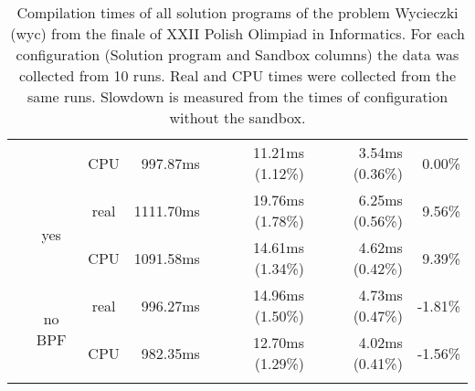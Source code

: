 \documentclass[en]{pracamgr}
\begin{document}
\begin{appendices}
\begin{small}
\begin{longtable}{|l|c|c|r|r|r|r|}
                            &                         & CPU  & 997.87ms & 11.21ms (1.12\%) & 3.54ms (0.36\%) & 0.00\% \\*
                            \cline{2-7}
                            & \multirow{2}{*}{yes}    & real & 1111.70ms & 19.76ms (1.78\%) & 6.25ms (0.56\%) & 9.56\% \\*
                            &                         & CPU  & 1091.58ms & 14.61ms (1.34\%) & 4.62ms (0.42\%) & 9.39\% \\*
                            \cline{2-7}
                            & \multirow{2}{*}{no BPF} & real & 996.27ms & 14.96ms (1.50\%) & 4.73ms (0.47\%) & -1.81\% \\*
                            &                         & CPU  & 982.35ms & 12.70ms (1.29\%) & 4.02ms (0.41\%) & -1.56\% \\
\hline
\pagebreak
\caption{Compilation times of all solution programs of the problem Wycieczki (wyc) from the finale of XXII Polish Olimpiad in Informatics. For each configuration (Solution program and Sandbox columns) the data was collected from 10 runs. Real and CPU times were collected from the same runs. Slowdown is measured from the times of configuration without the sandbox.}
\label{table:wyc_compilation}
\end{longtable}
\end{small}


\end{appendices}
\end{document}
